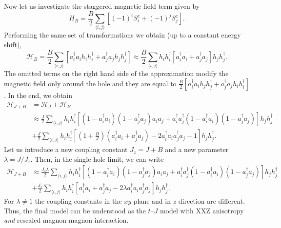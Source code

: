 \documentclass[%
 reprint,
 amsmath,amssymb,
 aps, onecolumn,
prl,
]{revtex4-1}
\newcommand{\mean}[1]{\langle#1\rangle}
\begin{document}
Now let us investigate the staggered magnetic field term given by
%
\begin{equation}
	H_{B} = \frac{B}{2} \sum_{\mean{i,j}} \left[(-1)^i S^z_i + (-1)^j S^z_j\right].
\end{equation}
%
Performing the same set of transformations we obtain (up to a constant energy shift),
%
\begin{equation}
	\mathcal{H}_{B} = \frac{B}{2} \sum_{\mean{i,j}} 
	\left[a_i^\dag a_i h_i h_i^\dag + a_j^\dag a_j h_j h_j^\dag \right] \approx \frac{B}{2} \sum_{\mean{i,j}} 
	h_i h_i^\dag \left[a_i^\dag a_i + a_j^\dag a_j \right] h_j h_j^\dag.
\end{equation}
%
The omitted terms on the right hand side of the approximation modify the magnetic field only around the hole and they are equal to $\frac{B}{2} \left[ a_i^\dag a_i h_j h_j^\dag + a_j^\dag a_j h_i h_i^\dag \right]$. In the end, we obtain
%
\begin{equation}
	\begin{aligned}
	\mathcal{H}_{J+B} &= \mathcal{H}_{J} + \mathcal{H}_{B} \\
	&\approx \frac{J}{2}\sum_{\mean{i,j}} h_i h_i^\dag \left[(1 - a_i^\dag a_i)(1 - a_j^\dag a_j)a_i a_j + a_i^\dag a_j^\dag (1 - a_i^\dag a_i)(1 - a_j^\dag a_j) \right] h_j h_j^\dag \\
	&+ \frac{J}{2} \sum_{\mean{i,j}} h_i h_i^\dag \left[\left(1+\frac{B}{J}\right)\left(a_i^\dag a_i + a_j^\dag a_j\right) - 2 a_i^\dag a_i a_j^\dag a_j - 1\right] h_j h_j^\dag.
	\end{aligned}
\end{equation}
%
Let us introduce a new coupling constant $J_z = J + B$ and a new parameter $\lambda = J / J_z$. Then, in the single hole limit, we can write
%
\begin{equation}
	\begin{aligned}
	\mathcal{H}_{J+B} 
	&\approx \frac{J_z \lambda}{2}\sum_{\mean{i,j}} h_i h_i^\dag \left[(1 - a_i^\dag a_i)(1 - a_j^\dag a_j)a_i a_j + a_i^\dag a_j^\dag (1 - a_i^\dag a_i)(1 - a_j^\dag a_j) \right] h_j h_j^\dag  \\
	&+ \frac{J_z}{2} \sum_{\mean{i,j}} h_i h_i^\dag \left[a_i^\dag a_i + a_j^\dag a_j - 2\lambda a_i^\dag a_i a_j^\dag a_j \right] h_j h_j^\dag.
	\end{aligned}
\end{equation}
%
For $\lambda \neq 1$ the coupling constants in the $xy$ plane and in $z$ direction are different. Thus, the final model can be understood as the $t$--$J$ model with XXZ anisotropy {\it and} rescaled magnon-magnon interaction.
\end{document}
